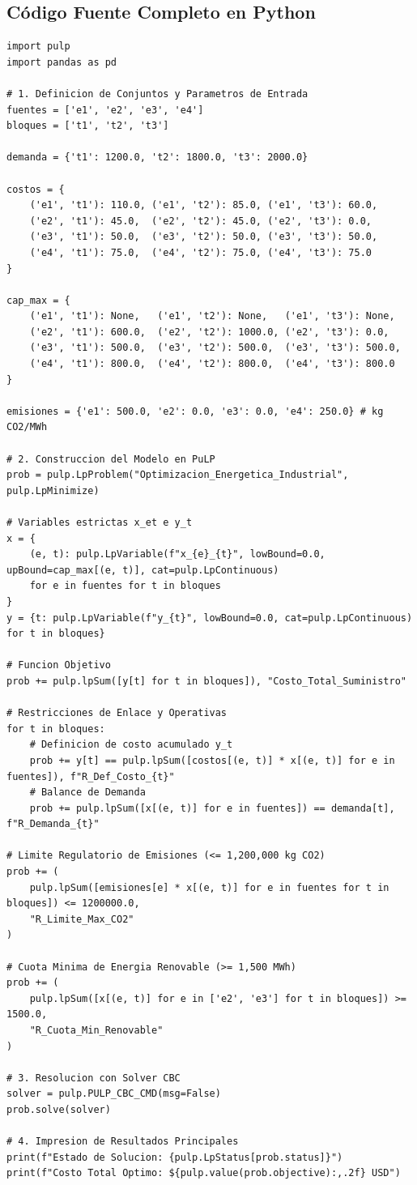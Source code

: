 \documentclass[11pt,a4paper]{article}
\begin{document}
\subsection{Código Fuente Completo en Python}
\begin{lstlisting}
import pulp
import pandas as pd

# 1. Definicion de Conjuntos y Parametros de Entrada
fuentes = ['e1', 'e2', 'e3', 'e4']
bloques = ['t1', 't2', 't3']

demanda = {'t1': 1200.0, 't2': 1800.0, 't3': 2000.0}

costos = {
    ('e1', 't1'): 110.0, ('e1', 't2'): 85.0, ('e1', 't3'): 60.0,
    ('e2', 't1'): 45.0,  ('e2', 't2'): 45.0, ('e2', 't3'): 0.0,
    ('e3', 't1'): 50.0,  ('e3', 't2'): 50.0, ('e3', 't3'): 50.0,
    ('e4', 't1'): 75.0,  ('e4', 't2'): 75.0, ('e4', 't3'): 75.0
}

cap_max = {
    ('e1', 't1'): None,   ('e1', 't2'): None,   ('e1', 't3'): None,
    ('e2', 't1'): 600.0,  ('e2', 't2'): 1000.0, ('e2', 't3'): 0.0,
    ('e3', 't1'): 500.0,  ('e3', 't2'): 500.0,  ('e3', 't3'): 500.0,
    ('e4', 't1'): 800.0,  ('e4', 't2'): 800.0,  ('e4', 't3'): 800.0
}

emisiones = {'e1': 500.0, 'e2': 0.0, 'e3': 0.0, 'e4': 250.0} # kg CO2/MWh

# 2. Construccion del Modelo en PuLP
prob = pulp.LpProblem("Optimizacion_Energetica_Industrial", pulp.LpMinimize)

# Variables estrictas x_et e y_t
x = {
    (e, t): pulp.LpVariable(f"x_{e}_{t}", lowBound=0.0, upBound=cap_max[(e, t)], cat=pulp.LpContinuous)
    for e in fuentes for t in bloques
}
y = {t: pulp.LpVariable(f"y_{t}", lowBound=0.0, cat=pulp.LpContinuous) for t in bloques}

# Funcion Objetivo
prob += pulp.lpSum([y[t] for t in bloques]), "Costo_Total_Suministro"

# Restricciones de Enlace y Operativas
for t in bloques:
    # Definicion de costo acumulado y_t
    prob += y[t] == pulp.lpSum([costos[(e, t)] * x[(e, t)] for e in fuentes]), f"R_Def_Costo_{t}"
    # Balance de Demanda
    prob += pulp.lpSum([x[(e, t)] for e in fuentes]) == demanda[t], f"R_Demanda_{t}"

# Limite Regulatorio de Emisiones (<= 1,200,000 kg CO2)
prob += (
    pulp.lpSum([emisiones[e] * x[(e, t)] for e in fuentes for t in bloques]) <= 1200000.0,
    "R_Limite_Max_CO2"
)

# Cuota Minima de Energia Renovable (>= 1,500 MWh)
prob += (
    pulp.lpSum([x[(e, t)] for e in ['e2', 'e3'] for t in bloques]) >= 1500.0,
    "R_Cuota_Min_Renovable"
)

# 3. Resolucion con Solver CBC
solver = pulp.PULP_CBC_CMD(msg=False)
prob.solve(solver)

# 4. Impresion de Resultados Principales
print(f"Estado de Solucion: {pulp.LpStatus[prob.status]}")
print(f"Costo Total Optimo: ${pulp.value(prob.objective):,.2f} USD")
\end{lstlisting}
\end{document}
